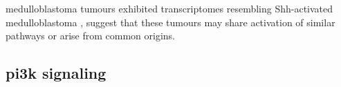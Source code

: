 medulloblastoma tumours exhibited transcriptomes resembling Shh-activated medulloblastoma , suggest that these tumours may share activation of similar pathways or arise from common origins.





\subsection{\gls{pi3k} signaling}

